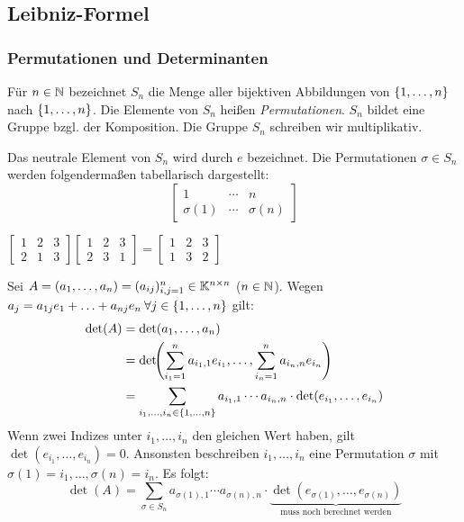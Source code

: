 \clearpage
\subsection{Leibniz-Formel}

\subsubsection{Permutationen und Determinanten}

Für $ n \in \mathbb N $ bezeichnet $ S_n $ die Menge aller bijektiven Abbildungen von $ \{ 1,\ldots,n \} $ nach $ \{ 1,\ldots,n \} $. Die Elemente von $ S_n $ heißen \emph{Permutationen}. $ S_n $ bildet eine Gruppe bzgl. der Komposition. Die Gruppe $ S_n $ schreiben wir multiplikativ.

Das neutrale Element von $ S_n $ wird durch $ e $ bezeichnet. Die Permutationen $ \sigma \in S_n $ werden folgendermaßen tabellarisch dargestellt:
\begin{equation}
	\begin{bmatrix}
		1 & \cdots & n \\
		\sigma(1) & \cdots & \sigma(n)
	\end{bmatrix}
\end{equation}

\begin{bsp}
	$
	\begin{bmatrix}
		1 & 2 & 3 \\
		2 & 1 & 3
	\end{bmatrix}
	\begin{bmatrix}
		1 & 2 & 3 \\
		2 & 3 & 1
	\end{bmatrix}
	=
	\begin{bmatrix}
		1 & 2 & 3 \\
		1 & 3 & 2
	\end{bmatrix}
	$
\end{bsp}

\noindent Sei $ A = (a_1, \ldots, a_n) = (a_{ij})_{i,j=1}^n \in \mathbb K^{n \times n} $ ($ n \in \mathbb N $). Wegen $ a_j = a_{1j}e_1 + \ldots + a_{nj}e_n \: \forall j \in \{ 1,\ldots,n \} $ gilt:
\begin{align*}
	\det(A) &= \det(a_1, \ldots, a_n) \\
	&= \det\!\!\left( \sum_{i_1=1}^{n} a_{i_1,1}e_{i_1}, \ldots, \sum_{i_n=1}^{n} a_{i_n,n}e_{i_n} \right) \\
	&= \sum_{i_1, \ldots, i_n \in \{ 1,\ldots,n \}} a_{i_1,1} \cdots a_{i_n,n} \cdot \det(e_{i_1}, \ldots, e_{i_n})
\end{align*}
Wenn zwei Indizes unter $ i_1, \ldots, i_n $ den gleichen Wert haben, gilt $ \det(e_{i_1}, \ldots, e_{i_n}) = 0 $. Ansonsten beschreiben $ i_1, \ldots, i_n $ eine Permutation $ \sigma $ mit $ \sigma(1) = i_1, \ldots, \sigma(n) = i_n $. Es folgt:
\begin{equation*}
	\det(A) = \sum\limits_{\sigma \in S_n} a_{\sigma(1),1} \cdots a_{\sigma(n),n} \cdot \underbrace{\det(e_{\sigma(1)}, \ldots, e_{\sigma(n)})}_\text{muss noch berechnet werden}
\end{equation*}

